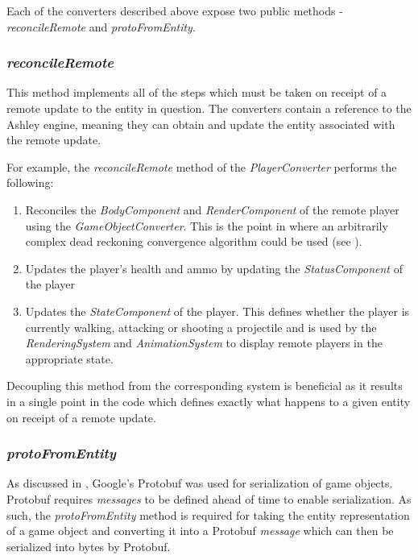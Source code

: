 Each of the converters described above expose two public methods - \textit{reconcileRemote} and \textit{protoFromEntity}.

\subsubsection{\textit{reconcileRemote}}
This method implements all of the steps which must be taken on receipt of a remote update to the entity in question. The converters contain a reference to the Ashley engine, meaning they can obtain and update the entity associated with the remote update.

For example, the \textit{reconcileRemote} method of the \textit{PlayerConverter} performs the following:
\begin{enumerate}
    \item Reconciles the \textit{BodyComponent} and \textit{RenderComponent} of the remote player using the \textit{GameObjectConverter}. This is the point in \game{} where an arbitrarily complex dead reckoning convergence algorithm could be used (see ).
    \item Updates the player's health and ammo by updating the \textit{StatusComponent} of the player
    \item Updates the \textit{StateComponent} of the player. This defines whether the player is currently walking, attacking or shooting a projectile and is used by the \textit{RenderingSystem} and \textit{AnimationSystem} to display remote players in the appropriate state. 
\end{enumerate}

Decoupling this method from the corresponding system is beneficial as it results in a single point in the code which defines exactly what happens to a given entity on receipt of a remote update.

\subsubsection{\textit{protoFromEntity}}
As discussed in , Google's Protobuf \cite{proto} was used for serialization of game objects. Protobuf requires \textit{messages} to be defined ahead of time to enable serialization. As such, the \textit{protoFromEntity} method is required for taking the entity representation of a game object and converting it into a Protobuf \textit{message} which can then be serialized into bytes by Protobuf. 

